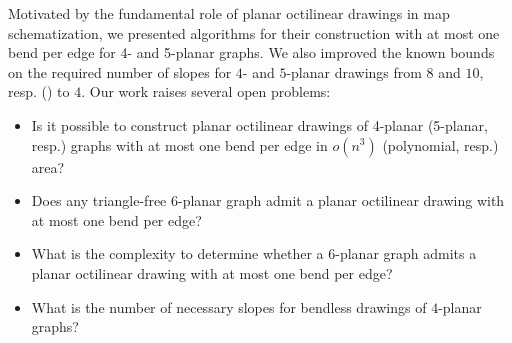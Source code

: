\documentclass[a4paper,twoside,11pt]{article}
\begin{document}
Motivated by the fundamental role of planar octilinear
drawings in map schematization, we presented algorithms for their construction
with at most one bend per edge for 4- and 5-planar graphs.
We also improved the known bounds on the required number of slopes
for $4$- and $5$-planar drawings from $8$ and $10$, resp.
(\cite{KPP13}) to $4$. Our work raises several open problems:

\begin{itemize}
\item Is it possible to construct planar octilinear drawings of
4-planar (5-planar, resp.) graphs with at most one bend per edge in
$o(n^3)$ (polynomial, resp.) area?
\item Does any triangle-free 6-planar graph admit a planar
octilinear drawing with at most one bend per edge?
\item What is the complexity to determine whether a $6$-planar graph
admits a planar octilinear drawing with at most one bend per edge?
\item What is the number of necessary slopes for bendless drawings
of $4$-planar graphs?
\end{itemize}



\end{document}
